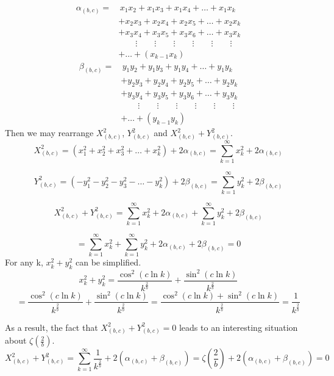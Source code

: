\documentclass{amsart}
\begin{document}
	\[
	\begin{aligned}
		\alpha_{(b,c)} =& \, x_1x_2 + x_1x_3 + x_1x_4 + \dots + x_{1}x_{k} \\
		& + x_2x_3 + x_2x_4 + x_2x_5 + \dots + x_2x_{k} \\
		& + x_3x_4 + x_3x_5 + x_3x_6 + \dots + x_3x_{k} \\
		& \qquad\vdots \qquad\vdots \qquad\vdots \qquad\vdots \qquad\vdots \qquad\vdots \\
		&  + \dots + (x_{k-1}x_{k})
	\end{aligned}
	\]
	\[\]
	\[
	\begin{aligned}
		\beta_{(b,c)} =& \, y_1y_2 + y_1y_3 + y_1y_4 + \dots + y_{1}y_{k} \\
		& + y_2y_3 + y_2y_4 + y_2y_5 + \dots + y_2y_{k} \\
		& + y_3y_4 + y_3y_5 + y_3y_6 + \dots + y_3y_{k} \\
		& \qquad\vdots \qquad\vdots \qquad\vdots \qquad\vdots \qquad\vdots \qquad\vdots \\
		&  + \dots + (y_{k-1}y_{k})
	\end{aligned}
	\]
	\[\]
	Then we may rearrange $X_{(b,c)}^2$, $Y_{(b,c)}^2$ and $X_{(b,c)}^2 + Y_{(b,c)}^2$.
	\[ X^2_{(b,c)} = (x_1^2 + x_2^2 + x_3^2 + \dots + x_k^2) + 2 \alpha_{(b,c)} = \sum\limits_{k=1}^{\infty}x_k^2 + 2 \alpha_{(b,c)} \]
	
	\[ Y^2_{(b,c)} = (-y_1^2 - y_2^2 - y_3^2 - \dots - y_k^2) + 2 \beta_{(b,c)} = \sum\limits_{k=1}^{\infty}y_k^2 + 2 \beta_{(b,c)} \]
	
	\[ X^2_{(b,c)} + Y^2_{(b,c)} = \sum\limits_{k=1}^{\infty}x_k^2 + 2\alpha_{(b,c)} + \sum\limits_{k=1}^{\infty}y_k^2 + 2\beta_{(b,c)} \]
	
	\[ = \sum\limits_{k=1}^{\infty}x_k^2 + \sum\limits_{k=1}^{\infty}y_k^2 + 2\alpha_{(b,c)} +  2\beta_{(b,c)} = 0 \]
	\[\]
	For any k, $x_k^2 + y_k^2$ can be simplified.
	\[ x_k^2 + y_k^2 = \frac{\cos^2(c \ln k)}{k^{\frac{2}{b}}} + \frac{\sin^2(c \ln k)}{k^{\frac{2}{b}}} \]
	\[ = \frac{\cos^2(c \ln k)}{k^{\frac{2}{b}}} + \frac{\sin^2(c \ln k)}{k^{\frac{2}{b}}} = \frac{\cos^2(c \ln k) + \sin^2(c \ln k)}{k^{\frac{2}{b}}} = \frac{1}{k^{\frac{2}{b}}} \]
	
	\[\]
	As a result, the fact that $X_{(b,c)}^2 + Y_{(b,c)}^2 = 0$ leads to an interesting situation about $\zeta(\frac{2}{b})$.
	\[ X^2_{(b,c)} + Y^2_{(b,c)} = \sum\limits_{k=1}^{\infty}\frac{1}{k^{\frac{2}{b}}} + 2(\alpha_{(b,c)} + \beta_{(b,c)}) = \zeta(\frac{2}{b}) + 2(\alpha_{(b,c)} + \beta_{(b,c)}) = 0 \]
	
\end{document}
